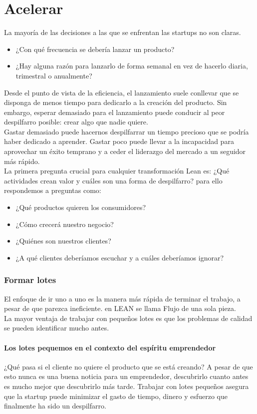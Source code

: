 \documentclass[10pt]{article}
\begin{document}
\part*{\center Acelerar}
\begin{multicols}{2}
La mayoría de las decisiones a las que se enfrentan las startups no son claras. 
\begin{itemize}
\item ¿Con qué frecuencia se debería lanzar un producto?
\item ¿Hay
alguna razón para lanzarlo de forma semanal en vez de hacerlo diaria, trimestral o anualmente?
\end{itemize}
Desde el punto de vista de la eficiencia, el lanzamiento suele conllevar que se disponga de menos tiempo para dedicarlo a la creación del  producto. Sin embargo, esperar demasiado para el lanzamiento puede conducir al peor despilfarro posible: crear algo que nadie quiere.\\
Gastar demasiado puede hacernos despilfarrar un tiempo precioso que se podría haber dedicado a aprender. Gastar poco puede llevar a la incapacidad para aprovechar un éxito temprano y a ceder el liderazgo del mercado a un seguidor más rápido.\\
La primera pregunta crucial para cualquier transformación Lean es: {\color{red}¿Qué actividades crean valor y cuáles son una forma de despilfarro?} para ello respondemos a preguntas como:
{\color{red}\begin{itemize}
\item ¿Qué productos quieren los consumidores?
\item ¿Cómo crecerá nuestro negocio?
\item ¿Quiénes son nuestros clientes?
\item ¿A qué clientes deberíamos escuchar y a cuáles deberíamos ignorar?
\end{itemize}}
\section*{Formar lotes}
El enfoque de ir uno a uno es la manera más rápida de terminar el trabajo, a pesar de que parezca ineficiente. en LEAN se llama {\color{blue}Flujo de una sola pieza}.\\
La mayor ventaja de trabajar con pequeños lotes es que los problemas de calidad se pueden identificar mucho antes. 
\subsection*{Los lotes pequemos en el contexto del espíritu emprendedor}
{\color{blue}¿Qué pasa si el cliente no quiere el producto que se está creando? A pesar de que esto nunca es una buena noticia para un emprendedor, descubrirlo cuanto antes es mucho mejor que descubrirlo más tarde. Trabajar con lotes pequeños asegura que la startup puede minimizar el gasto de tiempo, dinero y esfuerzo que finalmente ha sido un despilfarro.}

\end{multicols}
\end{document}
